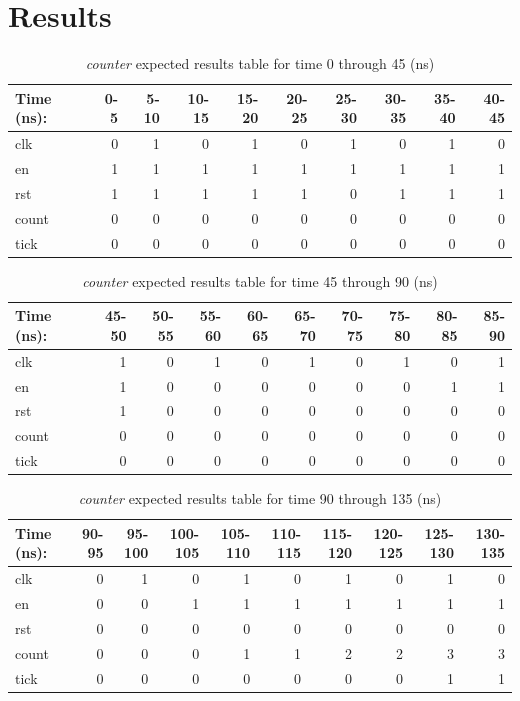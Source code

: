 \documentclass[11pt]{article}
\begin{document}
\section*{Results}

\begin{table}[ht]\centering
	\caption{\textit{counter} expected results table for time 0 through 45 (ns)}
	\label{ALU:tbl:counter_ERT_1}\medskip
	\begin{tabular}{l|rrrrrrrrr}
		Time (ns): & 0-5 & 5-10 & 10-15 & 15-20 & 20-25 & 25-30 & 30-35 & 35-40 & 40-45 \\
		\midrule
		clk & 0 & 1 & 0 & 1 & 0 & 1 & 0 & 1 & 0 \\
		en  & 1 & 1 & 1 & 1 & 1 & 1 & 1 & 1 & 1 \\
		rst & 1 & 1 & 1 & 1 & 1 & 0 & 1 & 1 & 1 \\
		count & 0 & 0 & 0 & 0 & 0 & 0 & 0 & 0 & 0 \\
		tick & 0 & 0 & 0 & 0 & 0 & 0 & 0 & 0 & 0 \\
		\bottomrule
	\end{tabular}
\end{table}

\begin{table}[ht]\centering
	\caption{\textit{counter} expected results table for time 45 through 90 (ns)}
	\label{ALU:tbl:counter_ERT_2}\medskip
	\begin{tabular}{l|rrrrrrrrr}
		Time (ns): & 45-50 & 50-55 & 55-60 & 60-65 & 65-70 & 70-75 & 75-80 & 80-85 & 85-90 \\
		\midrule
		clk & 1 & 0 & 1 & 0 & 1 & 0 & 1 & 0 & 1 \\
		en  & 1 & 0 & 0 & 0 & 0 & 0 & 0 & 1 & 1 \\
		rst & 1 & 0 & 0 & 0 & 0 & 0 & 0 & 0 & 0 \\
		count & 0 & 0 & 0 & 0 & 0 & 0 & 0 & 0 & 0 \\
		tick & 0 & 0 & 0 & 0 & 0 & 0 & 0 & 0 & 0 \\
		\bottomrule
	\end{tabular}
\end{table}

\begin{table}[ht]\centering
	\caption{\textit{counter} expected results table for time 90 through 135 (ns)}
	\label{ALU:tbl:counter_ERT_3}\medskip
	\begin{tabular}{l|rrrrrrrrr}
		Time (ns): & 90-95 & 95-100 & 100-105 & 105-110 & 110-115 & 115-120 & 120-125 & 125-130 & 130-135 \\
		\midrule
		clk & 0 & 1 & 0 & 1 & 0 & 1 & 0 & 1 & 0 \\
		en  & 0 & 0 & 1 & 1 & 1 & 1 & 1 & 1 & 1 \\
		rst & 0 & 0 & 0 & 0 & 0 & 0 & 0 & 0 & 0 \\
		count & 0 & 0 & 0 & 1 & 1 & 2 & 2 & 3 & 3 \\
		tick & 0 & 0 & 0 & 0 & 0 & 0 & 0 & 1 & 1 \\
		\bottomrule
	\end{tabular}
\end{table}
\end{document}
